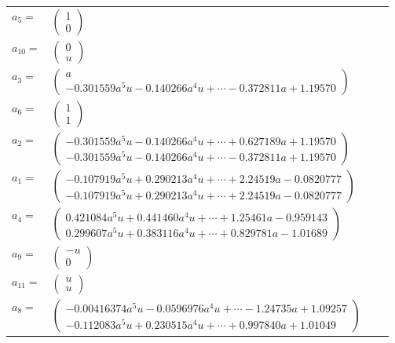 \documentclass[1p]{elsarticle_modified}
\theoremstyle{definition}
\begin{document}
\begin{tabular}{m{7pt} m{180pt} m{7pt} m{180pt} }
\flushright $a_{5}=$&$\begin{pmatrix}1\\0\end{pmatrix}$ \\
\flushright $a_{10}=$&$\begin{pmatrix}0\\u\end{pmatrix}$ \\
\flushright $a_{3}=$&$\begin{pmatrix}a\\-0.301559 a^{5} u-0.140266 a^{4} u+\cdots-0.372811 a+1.19570\end{pmatrix}$ \\
\flushright $a_{6}=$&$\begin{pmatrix}1\\1\end{pmatrix}$ \\
\flushright $a_{2}=$&$\begin{pmatrix}-0.301559 a^{5} u-0.140266 a^{4} u+\cdots+0.627189 a+1.19570\\-0.301559 a^{5} u-0.140266 a^{4} u+\cdots-0.372811 a+1.19570\end{pmatrix}$ \\
\flushright $a_{1}=$&$\begin{pmatrix}-0.107919 a^{5} u+0.290213 a^{4} u+\cdots+2.24519 a-0.0820777\\-0.107919 a^{5} u+0.290213 a^{4} u+\cdots+2.24519 a-0.0820777\end{pmatrix}$ \\
\flushright $a_{4}=$&$\begin{pmatrix}0.421084 a^{5} u+0.441460 a^{4} u+\cdots+1.25461 a-0.959143\\0.299607 a^{5} u+0.383116 a^{4} u+\cdots+0.829781 a-1.01689\end{pmatrix}$ \\
\flushright $a_{9}=$&$\begin{pmatrix}- u\\0\end{pmatrix}$ \\
\flushright $a_{11}=$&$\begin{pmatrix}u\\u\end{pmatrix}$ \\
\flushright $a_{8}=$&$\begin{pmatrix}-0.00416374 a^{5} u-0.0596976 a^{4} u+\cdots-1.24735 a+1.09257\\-0.112083 a^{5} u+0.230515 a^{4} u+\cdots+0.997840 a+1.01049\end{pmatrix}$ \\

\end{tabular}
\end{document}
